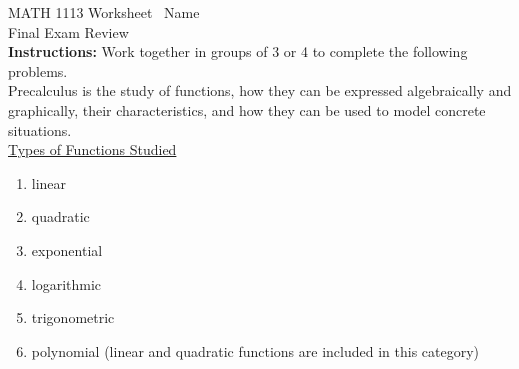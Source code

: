 \documentclass[11pt]{article}
\begin{document}
\noindent MATH 1113   \quad\quad\quad\quad\quad Worksheet \quad\quad\quad\quad\quad\   Name \underline{\phantom{alphabetsoupismyveryveryfavorite}}\\ 
\noindent Final Exam Review\\




\noindent \textbf{Instructions:}  Work together in groups of  3 or 4 to complete the following problems.\\
\noindent Precalculus is the study of functions, how they can be expressed algebraically and graphically, their characteristics, and how they can be used to model concrete situations.\\

\noindent \underline{Types of Functions Studied}
\begin{enumerate}
\item linear
\item quadratic
\item exponential
\item logarithmic
\item trigonometric
\item polynomial (linear and quadratic functions are included in this category)
\end{enumerate}
\end{document}

